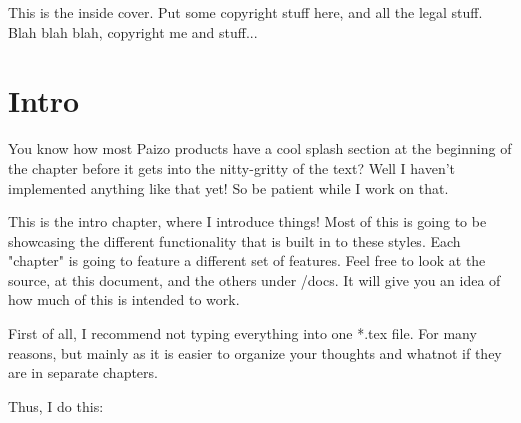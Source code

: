 \documentclass[10pt,letterpaper,onecolumn,openany]{book}
\begin{document}
\frontmatter

\pfMakeCover[
  image = ai-generated-cover-art,
  title = PF2e-\TeX Spellbook,
  subtitle = {Is it a spellbook, or a cheatsheet?} %
]

This is the inside cover.
Put some copyright stuff here, and all the legal stuff.
Blah blah blah, copyright me and stuff...

\lipsum[1-5]


\tableofcontents

\mainmatter

\chapter{Intro}

You know how most Paizo products have a cool splash section at the beginning of the chapter before it gets into the nitty-gritty of the text?
Well I haven't implemented anything like that yet!
So be patient while I work on that.

\begin{multicols}{2}

This is the intro chapter, where I introduce things!
Most of this is going to be showcasing the different functionality that is built in to these styles.
Each "chapter" is going to feature a different set of features.
Feel free to look at the source, at this document, and the others under /docs.
It will give you an idea of how much of this is intended to work.

First of all, I recommend not typing everything into one *.tex file.
For many reasons, but mainly as it is easier to organize your thoughts and whatnot if they are in separate chapters.

Thus, I do this:

\end{multicols}


\end{document}
